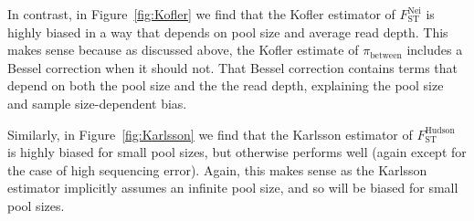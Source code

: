 \documentclass[a4paper,fontsize=9pt,DIV=14]{scrartcl}
\newcommand\figref[1]{Figure~\ref{#1}}
\newcommand{\neifst}{F_\text{ST}^\text{Nei}}
\newcommand{\hudsonfst}{F_\text{ST}^\text{Hudson}}
\begin{document}
In contrast, in \figref{fig:Kofler} we find that the Kofler estimator of $\neifst$ is highly biased in a way that depends on pool size and average read depth.  This makes sense because as discussed above, the Kofler estimate of $\pi_\text{between}$ includes a Bessel correction when it should not.  That Bessel correction contains terms that depend on both the pool size and the the read depth, explaining the pool size and sample size-dependent bias.

Similarly, in \figref{fig:Karlsson} we find that the Karlsson estimator of $\hudsonfst$ is highly biased for small pool sizes, but otherwise performs well (again except for the case of high sequencing error).  Again, this makes sense as the Karlsson estimator implicitly assumes an infinite pool size, and so will be biased for small pool sizes.
\end{document}
